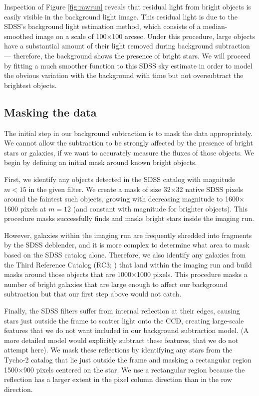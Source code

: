 \documentclass[10pt,preprint]{aastex}
\begin{document}
Inspection of Figure \ref{fig:rawrun} reveals that residual light from
bright objects is easily visible in the background light image. This
residual light is due to the SDSS's background light estimation
method, which consists of a median-smoothed image on a scale of
100$\times$100 arcsec.  Under this procedure, large objects have a
substantial amount of their light removed during background
subtraction --- therefore, the background shows the presence of bright
stars.  We will proceed by fitting a much smoother function to this
SDSS sky estimate in order to model the obvious variation with the
background with time but not oversubtract the brightest objects.


\subsection{Masking the data}
\label{sec:mask}

The initial step in our background subtraction is to mask the data
appropriately. We cannot allow the subtraction to be strongly affected
by the presence of bright stars or galaxies, if we want to accurately
measure the fluxes of those objects. We begin by defining an initial
mask around known bright objects.

First, we identify any objects detected in the SDSS catalog with
magnitude $m<15$ in the given filter. We create a mask of size
32$\times$32 native SDSS pixels around the faintest such objects,
growing with decreasing magnitude to 1600$\times$1600 pixels at $m=12$
(and constant with magnitude for brighter objects).  This procedure
masks successfully finds and masks bright stars inside the imaging
run.

However, galaxies within the imaging run are frequently shredded into
fragments by the SDSS deblender, and it is more complex to determine
what area to mask based on the SDSS catalog alone. Therefore, we also
identify any galaxies from the Third Reference Catalog (RC3;
\citealt{devaucouleurs91a}) that land within the imaging run and build
masks around those objects that are 1000$\times$1000 pixels.  This
procedure masks a number of bright galaxies that are large enough to
affect our background subtraction but that our first step above would
not catch.

Finally, the SDSS filters suffer from internal reflection at their
edges, causing stars just outside the frame to scatter light onto the
CCD, creating large-scale features that we do not want included in our
background subtraction model. (A more detailed model would explicitly
subtract these features, that we do not attempt here).  We mask these
reflections by identifying any stars from the Tycho-2 catalog that lie
just outside the frame and masking a rectangular region
1500$\times$900 pixels centered on the star. We use a rectangular
region because the reflection has a larger extent in the pixel column
direction than in the row direction.
\end{document}
